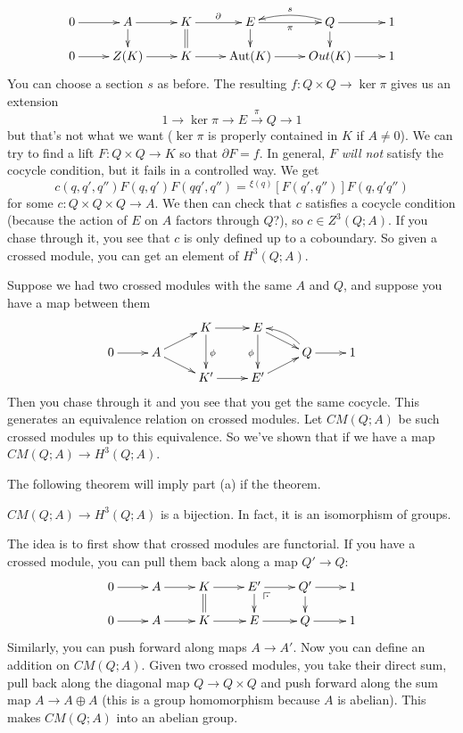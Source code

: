 \[\xymatrix@R-1pc{
 0\ar[r] & A\ar[r]\ar[d] & K\ar@{=}[d]\ar[r]^\partial & E\ar[r]_\pi\ar[d] & Q \ar[d]\ar[r] \ar@/_/[l]_s & 1\\
 0\ar[r] & Z(K)\ar[r] & K\ar[r] & \Aut(K)\ar[r] & Out(K) \ar[r] & 1
}\]
You can choose a section $s$ as before. The resulting $f\colon Q\times Q\to \ker \pi$ gives us an extension
\[
 1\to \ker \pi \to E\xrightarrow \pi Q\to 1
\]
but that's not what we want ($\ker \pi$ is properly contained in $K$ if $A\neq 0$). We can try to find a lift $F\colon Q\times Q\to K$ so that $\partial F=f$. In general, $F$ \emph{will not} satisfy the cocycle condition, but it fails in a controlled way. We get
\[
 c(q,q',q'') F(q,q')F(qq',q'')={}^{\xi(q)}[F(q',q'')]F(q,q'q'')
\]
for some $c\colon Q\times Q\times Q\to A$. We then can check that $c$ satisfies a cocycle condition (because the action of $E$ on $A$ factors through $Q$?), so $c\in Z^3(Q;A)$. If you chase through it, you see that $c$ is only defined up to a coboundary. So given a crossed module, you can get an element of $H^3(Q;A)$.

Suppose we had two crossed modules with the same $A$ and $Q$, and suppose you have a map between them
\[\xymatrix@R-1.5pc{
 & & K\ar[r] \ar[dd]^\phi& E \ar[dr] \ar[dd]_\phi\\
 0\ar[r] & A\ar[dr]\ar[ur] & & & Q\ar[r] \ar@/_/[ul] & 1\\
 & & K'\ar[r] & E'\ar[ur]
}\]
Then you chase through it and you see that you get the same cocycle. This generates an equivalence relation on crossed modules. Let $CM(Q;A)$ be such crossed modules up to this equivalence. So we've shown that if we have a map $CM(Q;A)\to H^3(Q;A)$.

The following theorem will imply part (a) if the theorem.
\begin{theorem}
 $CM(Q;A)\to H^3(Q;A)$ is a bijection. In fact, it is an isomorphism of groups.
\end{theorem}
The idea is to first show that crossed modules are functorial. If you have a crossed module, you can pull them back along a map $Q'\to Q$:
\[\xymatrix@R-1pc{
 0\ar[r] & A\ar[r] \ar@{=}& K\ar[r]\ar@{=}[d] & E' \ar@{}[dr]|(.25)\pb \ar[r] \ar[d] & Q' \ar[r]\ar[d] & 1\\
 0\ar[r] & A\ar[r] & K\ar[r] & E\ar[r] & Q \ar[r] & 1
}\]
Similarly, you can push forward along maps $A\to A'$. Now you can define an addition on $CM(Q;A)$. Given two crossed modules, you take their direct sum, pull back along the diagonal map $Q\to Q\times Q$ and push forward along the sum map $A\to A\oplus A$ (this is a group homomorphism because $A$ is abelian). This makes $CM(Q;A)$ into an abelian group.

